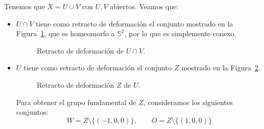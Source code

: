\documentclass[12pt]{article}
\begin{document}
\begin{ejercicio}
\begin{enumerate}[label=\alph*)]
                Tenemos que $X=U\cup V$ con $U,V$ abiertos. Veamos que:
                \begin{itemize}
                    \item $U\cap V$ tiene como retracto de deformación el conjunto mostrado en la Figura~\ref{fig:retracto}, que es homeomorfo a $\mathbb{S}^2$, por lo que es simplemente conexo.
                        \begin{figure}[h]
                            \centering
                            \caption{Retracto de deformación de $U\cap V$.}
                            \label{fig:retracto}
                        \end{figure}
                    \item $U$ tiene como retracto de deformación el conjunto $Z$ mostrado en la Figura~\ref{fig:retracto2}.
                         \begin{figure}[h]
                            \centering
                            \caption{Retracto de deformación $Z$ de $U$.}
                            \label{fig:retracto2}
                        \end{figure}   

                        Para obtener el grupo fundamental de $Z$, consideramos los siguientes conjuntos:
                        \begin{equation*}
                            W = Z\setminus \{(-1,0,0)\}, \qquad O = Z\setminus \{(1,0,0)\}
                        \end{equation*}
                        

\end{itemize}
\end{enumerate}
\end{ejercicio}
\end{document}
